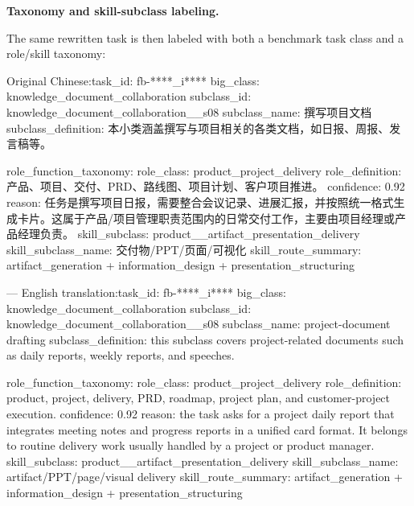 \documentclass{llmxive}
\providecommand{\caseheader}[1]{\noindent\colorbox{fbcaseblue}{\parbox{0.96\linewidth}{\bfseries #1}}\vspace{0.5mm}\newline}
\begin{document}
\caseheader{Taxonomy and skill-subclass labeling.}
The same rewritten task is then labeled with both a benchmark task class and a role/skill taxonomy:

\begin{casebox}\scriptsize
\begin{caselines}
Original Chinese:\nopagebreak[4]
task\_id: fb-****\_i****
big\_class: knowledge\_document\_collaboration
subclass\_id: knowledge\_document\_collaboration\_\_s08
subclass\_name: 撰写项目文档
subclass\_definition: 本小类涵盖撰写与项目相关的各类文档，如日报、周报、发言稿等。

role\_function\_taxonomy:
  role\_class: product\_project\_delivery
  role\_definition: 产品、项目、交付、PRD、路线图、项目计划、客户项目推进。
  confidence: 0.92
  reason: 任务是撰写项目日报，需要整合会议记录、进展汇报，并按照统一格式生成卡片。这属于产品/项目管理职责范围内的日常交付工作，主要由项目经理或产品经理负责。
  skill\_subclass: product\_\_artifact\_presentation\_delivery
  skill\_subclass\_name: 交付物/PPT/页面/可视化
  skill\_route\_summary: artifact\_generation + information\_design + presentation\_structuring

---
English translation:\nopagebreak[4]
task\_id: fb-****\_i****
big\_class: knowledge\_document\_collaboration
subclass\_id: knowledge\_document\_collaboration\_\_s08
subclass\_name: project-document drafting
subclass\_definition: this subclass covers project-related documents such as daily reports, weekly reports, and speeches.

role\_function\_taxonomy:
  role\_class: product\_project\_delivery
  role\_definition: product, project, delivery, PRD, roadmap, project plan, and customer-project execution.
  confidence: 0.92
  reason: the task asks for a project daily report that integrates meeting notes and progress reports in a unified card format. It belongs to routine delivery work usually handled by a project or product manager.
  skill\_subclass: product\_\_artifact\_presentation\_delivery
  skill\_subclass\_name: artifact/PPT/page/visual delivery
  skill\_route\_summary: artifact\_generation + information\_design + presentation\_structuring
\end{caselines}
\end{casebox}
\end{document}
